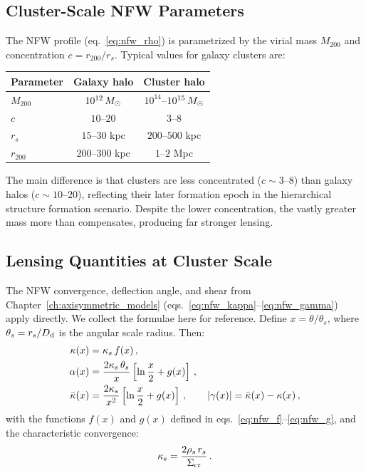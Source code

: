 \subsection{Cluster-Scale NFW Parameters}

The NFW profile (eq.~\ref{eq:nfw_rho}) is parametrized by the virial
mass $M_{200}$ and concentration $c = r_{200}/r_s$.  Typical values
for galaxy clusters are:
\begin{center}
\begin{tabular}{lcc}
\toprule
\textbf{Parameter} & \textbf{Galaxy halo} & \textbf{Cluster halo} \\
\midrule
$M_{200}$ & $10^{12}\,M_{\odot}$ & $10^{14}$--$10^{15}\,M_{\odot}$ \\
$c$ & $10$--$20$ & $3$--$8$ \\
$r_s$ & $15$--$30$ kpc & $200$--$500$ kpc \\
$r_{200}$ & $200$--$300$ kpc & $1$--$2$ Mpc \\
\bottomrule
\end{tabular}
\end{center}
The main difference is that clusters are less concentrated
($c \sim 3$--$8$) than galaxy halos ($c \sim 10$--$20$), reflecting
their later formation epoch in the hierarchical structure formation
scenario.  Despite the lower concentration, the vastly greater mass
more than compensates, producing far stronger lensing.

\subsection{Lensing Quantities at Cluster Scale}

The NFW convergence, deflection angle, and shear from
Chapter~\ref{ch:axisymmetric_models} (eqs.~\ref{eq:nfw_kappa}--\ref{eq:nfw_gamma})
apply directly.  We collect the formulae here for reference.  Define
$x = \theta/\theta_s$, where $\theta_s = r_s/D_{\mathrm{d}}$ is the angular scale
radius.  Then:
\begin{align}
    \kappa(x) &= \kappa_s\, f(x) \,,
    \label{eq:cl_nfw_kappa} \\
    \alpha(x) &= \frac{2\kappa_s\,\theta_s}{x}
    \left[\ln\frac{x}{2} + g(x)\right] \,,
    \label{eq:cl_nfw_alpha} \\
    \bar\kappa(x) &= \frac{2\kappa_s}{x^2}
    \left[\ln\frac{x}{2} + g(x)\right] \,,
    \qquad
    |\gamma(x)| = \bar{\kappa}(x) - \kappa(x) \,,
    \label{eq:cl_nfw_gamma}
\end{align}
with the functions $f(x)$ and $g(x)$ defined in
eqs.~\eqref{eq:nfw_f}--\eqref{eq:nfw_g}, and the characteristic
convergence:
\begin{equation}
    \kappa_s = \frac{2\rho_s\, r_s}{\Sigma_{\mathrm{cr}}} \,.
    \label{eq:cl_kappa_s}
\end{equation}

